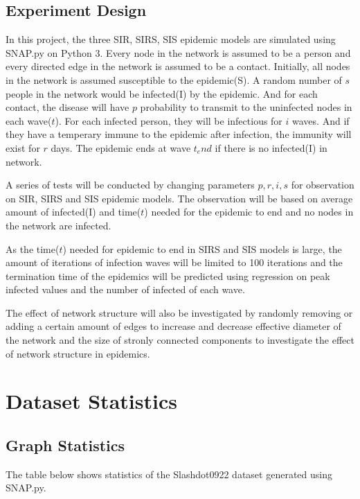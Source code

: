\documentclass{subfiles}
\begin{document}
  \subsection{Experiment Design}
  In this project, the three SIR, SIRS, SIS epidemic models are simulated using SNAP.py on Python 3. Every node in the network is assumed to be a person and every directed edge in the network is assumed to be a contact. Initially, all nodes in the network is assumed susceptible to the epidemic(S). A random number of \(s\) people in the network would be infected(I) by the epidemic. And for each contact, the disease will have \(p\) probability to transmit to the uninfected nodes in each wave(\(t\)). For each infected person, they will be infectious for \(i\) waves. And if they have a temperary immune to the epidemic after infection, the immunity will exist for \(r\) days. The epidemic ends at wave \(t_end\) if there is no infected(I) in network.

  A series of tests will be conducted by changing parameters \(p, r, i, s\) for observation on SIR, SIRS and SIS epidemic models. The observation will be based on average amount of infected(I) and time(\(t\)) needed for the epidemic to end and no nodes in the network are infected.

  As the time(\(t\)) needed for epidemic to end in SIRS and SIS models is large, the amount of iterations of infection waves will be limited to 100 iterations and the termination time of the epidemics will be predicted using regression on peak infected values and the number of infected of each wave.

  The effect of network structure will also be investigated by randomly removing or adding a certain amount of edges to increase and decrease effective diameter of the network and the size of stronly connected components to investigate the effect of network structure in epidemics.

  \section{Dataset Statistics}
  \subsection{Graph Statistics}
  The table below shows statistics of the Slashdot0922 dataset\cite{snapnets} generated using SNAP.py\cite{leskovec2016snap}.
\end{document}
